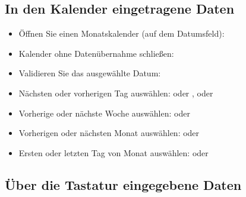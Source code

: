 \subsection{In den Kalender eingetragene Daten}

\begin{itemize}
	\item Öffnen Sie einen Monatskalender (auf dem Datumsfeld): 
	\item Kalender ohne Datenübernahme schließen: 
	\item Validieren Sie das ausgewählte Datum: 
	\item Nächsten oder vorherigen Tag auswählen: \keys{{+}} oder \keys{{-}}, \keys{\arrowkeyright} oder \keys{\arrowkeyleft}
	\item Vorherige oder nächste Woche auswählen: \keys{\arrowkeyup} oder \keys{\arrowkeydown}
	\item Vorherigen oder nächsten Monat auswählen:  oder 
	\item Ersten oder letzten Tag von Monat auswählen:  oder 
\end{itemize}

\subsection{Über die Tastatur eingegebene Daten}

